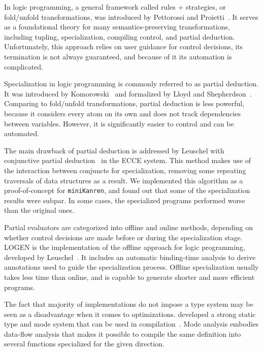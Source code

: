 In logic programming, a general framework called rules + strategies, or fold/unfold transformations, was introduced by Pettorossi and Proietti~\cite{pettorossi1996rules,pettorossi1994transformation}. 
It serves as a foundational theory for many semantics-preserving transformations, including tupling, specialization, compiling control, and partial deduction. 
Unfortunately, this approach relies on user guidance for control decisions, its termination is not always guaranteed, and because of it its automation is complicated. 

Specialization in logic programming is commonly referred to as partial deduction. 
It was introduced by Komorowski~\cite{komorowski1982partial} and formalized by Lloyd and Shepherdson~\cite{lloyd1991partial}. 
Comparing to fold/unfold transformations, partial deduction is less powerful, because it considers every atom on its own and does not track dependencies between variables. 
However, it is significantly easier to control and can be automated. 

The main drawback of partial deduction is addressed by Leuschel with conjunctive partial deduction~\cite{de1999conjunctive} in the ECCE system. 
This method makes use of the interaction between conjuncts for specialization, removing some repeating traversals of data structures as a result. 
We implemented this algorithm as a proof-of-concept for \texttt{miniKanren}, and found out that some of the specialization results were subpar.
In some cases, the specialized programs performed worse than the original ones. 

Partial evaluators are categorized into offline and online methods, depending on whether control decisions are made before or during the specialization stage. 
LOGEN is the implementation of the offline approach for logic programming, developed by Leuschel~\cite{leuschel2004offline}. 
It includes an automatic binding-time analysis to derive annotations used to guide the specialization process. 
Offline specialization usually takes less time than online, and is capable to generate shorter and more efficient programs. 

The fact that majority of \prolog implementations do not impose a type system may be seen as a disadvantage when it comes to optimizations. 
\merc developed a strong static type and mode system that can be used in compilation~\cite{overton2002constraint,overton2003precise}. 
Mode analysis embodies data-flow analysis that makes it possible to compile the same definition into several functions specialized for the given direction. 

